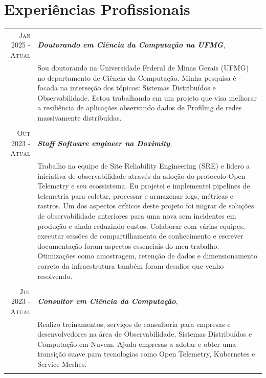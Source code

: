 \documentclass[a4paper,10pt]{article} %
\begin{document}
\section{Experiências Profissionais}

\begin{longtable}{r|p{11cm}}

\textsc{Jan 2025 - Atual} & \emph{\bf Doutorando em Ciência da Computação na UFMG}, \\
& \footnotesize{
  Sou doutorando na Universidade Federal de Minas Gerais (UFMG) no
  departamento de Ciência da Computação. Minha pesquisa é focada na interseção dos
  tópicos: Sistemas Distribuídos e Observabilidade. Estou trabalhando em um projeto
  que visa melhorar a resiliência de aplicações observando dados de Profiling de 
  redes massivamente distribuídas.
  } \\
\multicolumn{2}{c}{} \\

\textsc{Out 2023 - Atual} & \emph{\bf Staff Software engineer na Doximity}, \\
& \footnotesize{
  Trabalho na equipe de Site Reliability Engineering (SRE) e lidero a iniciativa de observabilidade através
  da adoção do protocolo Open Telemetry e seu ecossistema. Eu projetei e implementei pipelines de telemetria
  para coletar, processar e armazenar logs, métricas e rastros. Um dos aspectos críticos deste projeto foi
  migrar de soluções de observabilidade anteriores para uma nova sem incidentes em produção e ainda reduzindo
  custos. Colaborar com várias equipes, executar sessões de compartilhamento de conhecimento e escrever
  documentação foram aspectos essenciais do meu trabalho. Otimizações como amostragem, retenção de dados e 
  dimensionamento correto da infraestrutura também foram desafios que venho resolvendo.
  } \\
\multicolumn{2}{c}{} \\

\textsc{Jul 2023 - Atual} & \emph{\bf Consultor em Ciência da Computação}, \\
& \footnotesize{
  Realizo treinamentos, serviços de consultoria para empresas e desenvolvedores
  na área de Observabilidade, Sistemas Distribuídos e Computação em Nuvem. Ajuda
  empresas a adotar e obter uma transição suave para tecnologias como Open Telemetry,
  Kubernetes e Service Meshes.
  } \\
\multicolumn{2}{c}{} \\


\end{longtable}
\end{document}
